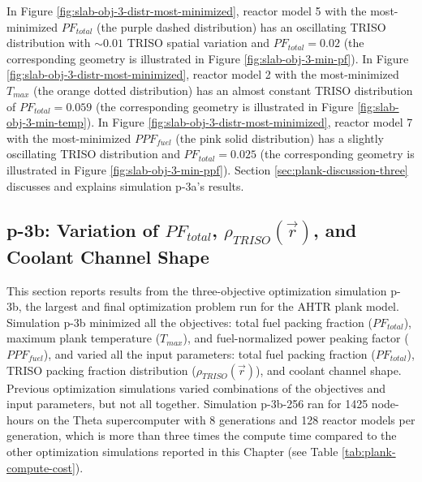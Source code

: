 In Figure \ref{fig:slab-obj-3-distr-most-minimized}, reactor model 5 with the
most-minimized $PF_{total}$ (the purple dashed distribution) has an oscillating TRISO 
distribution with ${\sim}0.01$ TRISO spatial variation and $PF_{total} = 0.02$ 
(the corresponding geometry is illustrated in Figure \ref{fig:slab-obj-3-min-pf}).
In Figure \ref{fig:slab-obj-3-distr-most-minimized}, reactor model 2 with the 
most-minimized $T_{max}$ (the orange dotted distribution) has an almost constant TRISO 
distribution of $PF_{total}=0.059$ (the corresponding geometry is illustrated in Figure 
\ref{fig:slab-obj-3-min-temp}). 
In Figure \ref{fig:slab-obj-3-distr-most-minimized}, reactor model 7 with the
most-minimized $PPF_{fuel}$ (the pink solid distribution) has a 
slightly oscillating TRISO distribution and $PF_{total} = 0.025$ 
(the corresponding geometry is illustrated in Figure \ref{fig:slab-obj-3-min-ppf}).
Section \ref{sec:plank-discussion-three} discusses and explains simulation p-3a's results.

\subsection{p-3b: Variation of $PF_{total}$, $\rho_{TRISO}(\vec{r})$, and Coolant 
Channel Shape}
\label{sec:p-3b}
This section reports results from the three-objective optimization simulation p-3b, 
the largest and final optimization problem run for the \gls{AHTR} plank model. 
Simulation p-3b minimized all the objectives: total fuel packing fraction 
($PF_{total}$), maximum plank temperature ($T_{max}$), and fuel-normalized power 
peaking factor ($PPF_{fuel}$), and varied all the input parameters: total fuel packing 
fraction ($PF_{total}$), TRISO packing fraction distribution ($\rho_{TRISO}(\vec{r})$), 
and coolant channel shape.  
Previous optimization simulations varied combinations of the objectives and input 
parameters, but not all together. 
Simulation p-3b-256 ran for 1425 node-hours on the Theta supercomputer 
with 8 generations and 128 reactor models per generation, which is more than three 
times the compute time compared to the other optimization simulations reported 
in this Chapter (see Table \ref{tab:plank-compute-cost}). 

